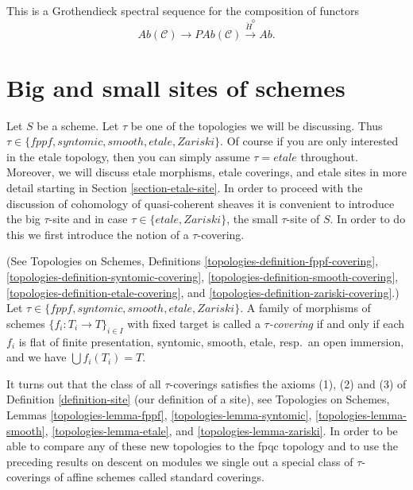 \begin{remark}
\label{remark-grothendieck-ss}
This is a Grothendieck spectral sequence for the composition of functors
$$
\textit{Ab}(\mathcal{C}) \longrightarrow
\textit{PAb}(\mathcal{C}) \xrightarrow{\check H^0} \textit{Ab}.
$$
\end{remark}








\section{Big and small sites of schemes}
\label{section-big-small}

\noindent
Let $S$ be a scheme.
Let $\tau$ be one of the topologies we will be discussing.
Thus $\tau \in \{fppf, syntomic, smooth, etale, Zariski\}$.
Of course if you are only interested in the etale topology, then
you can simply assume $\tau = etale$ throughout. Moreover, we will
discuss etale morphisms, etale coverings, and etale sites
in more detail starting in Section \ref{section-etale-site}.
In order to proceed with the discussion of cohomology of
quasi-coherent sheaves it is convenient to introduce the
big $\tau$-site and in case $\tau \in \{etale, Zariski\}$, the
small $\tau$-site of $S$. In order to do this we first introduce
the notion of a $\tau$-covering.

\begin{definition}
\label{definition-tau-covering}
(See Topologies on Schemes, Definitions
\ref{topologies-definition-fppf-covering},
\ref{topologies-definition-syntomic-covering},
\ref{topologies-definition-smooth-covering},
\ref{topologies-definition-etale-covering}, and
\ref{topologies-definition-zariski-covering}.)
Let $\tau \in \{fppf, syntomic, smooth, etale, Zariski\}$.
A family of morphisms of schemes $\{f_i : T_i \to T\}_{i \in I}$ with fixed
target is called a {\it $\tau$-covering} if and only if
each $f_i$ is flat of finite presentation, syntomic, smooth, etale,
resp.\ an open immersion, and we have $\bigcup f_i(T_i) = T$.
\end{definition}

\noindent
It turns out that the class of all $\tau$-coverings satisfies the axioms
(1), (2) and (3) of
Definition \ref{definition-site} (our definition of a site), see
Topologies on Schemes, Lemmas
\ref{topologies-lemma-fppf},
\ref{topologies-lemma-syntomic},
\ref{topologies-lemma-smooth},
\ref{topologies-lemma-etale}, and
\ref{topologies-lemma-zariski}.
In order to be able to compare any of these new topologies to the fpqc topology
and to use the preceding results on descent on modules we single out a special
class of $\tau$-coverings of affine schemes called standard coverings.

